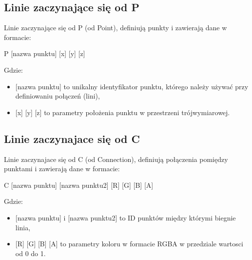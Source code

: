 \documentclass[12pt]{article}
\begin{document}
\subsection{Linie zaczynające się od P}
Linie zaczynające się od P (od Point), definiują punkty i zawierają dane w formacie:
\begin{center}
    P [nazwa punktu] [x] [y] [z]
\end{center}

Gdzie: 
\begin{itemize}
    \item {[nazwa punktu]} to unikalny identyfikator punktu, którego należy używać przy definiowaniu połączeń (lini),
    \item {[x] [y] [z]} to parametry położenia punktu w przestrzeni trójwymiarowej.
\end{itemize}

\subsection{Linie zaczynajace się od C}
Linie zaczynajace się od C (od Connection), definiują połączenia pomiędzy punktami i zawierają dane w formacie:
\begin{center}
    C [nazwa punktu] [nazwa punktu2] [R] [G] [B] [A]
\end{center}

Gdzie: 
\begin{itemize}
    \item {[nazwa punktu]} i [nazwa punktu2] to ID punktów między którymi biegnie linia,
    \item {[R] [G] [B] [A]} to parametry koloru w formacie RGBA w przedziale wartosci od 0 do 1.
\end{itemize}
\end{document}
